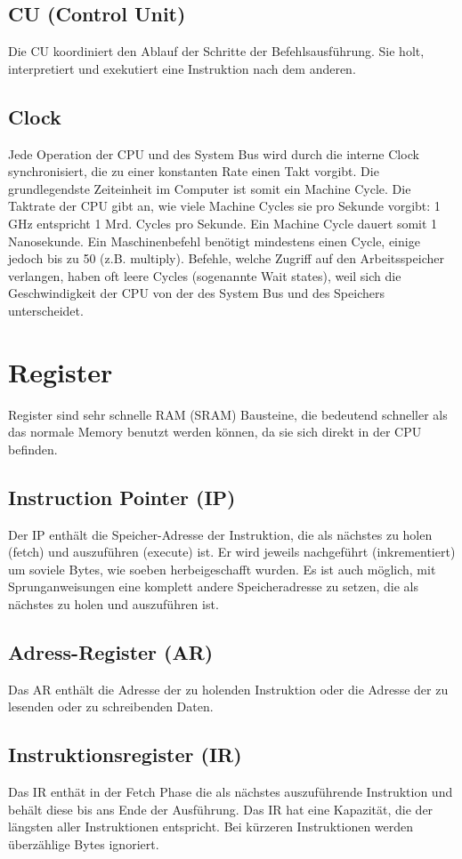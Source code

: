\documentclass[a4paper,10pt]{report}
\begin{document}
\subsection{CU (Control Unit)}
Die CU koordiniert den Ablauf der Schritte der Befehlsausführung. Sie holt, interpretiert und exekutiert eine Instruktion nach dem anderen. 
\subsection{Clock}
Jede Operation der CPU und des System Bus wird durch die interne Clock synchronisiert, die zu einer konstanten Rate einen Takt vorgibt. Die grundlegendste Zeiteinheit im Computer ist somit ein Machine Cycle.
Die Taktrate der CPU gibt an, wie viele Machine Cycles sie pro Sekunde vorgibt: 1 GHz entspricht 1 Mrd. Cycles pro Sekunde. Ein Machine Cycle dauert somit 1 Nanosekunde. Ein Maschinenbefehl benötigt mindestens einen Cycle, einige jedoch bis zu 50 (z.B. multiply). Befehle, welche Zugriff auf den Arbeitsspeicher verlangen, haben oft leere Cycles (sogenannte Wait states), weil sich die Geschwindigkeit der CPU von der des System Bus und des Speichers unterscheidet.
\section{Register}
Register sind sehr schnelle RAM (SRAM) Bausteine, die bedeutend schneller als das normale Memory benutzt werden können, da sie sich direkt in der CPU befinden.
\subsection{Instruction Pointer (IP)}
Der IP enthält die Speicher-Adresse der Instruktion, die als nächstes zu holen (fetch) und auszuführen (execute) ist. Er wird jeweils nachgeführt (inkrementiert) um soviele Bytes, wie soeben herbeigeschafft wurden. Es ist auch möglich, mit Sprunganweisungen eine komplett andere Speicheradresse zu setzen, die als nächstes zu holen und auszuführen ist.
\subsection{Adress-Register (AR)}
Das AR enthält die Adresse der zu holenden Instruktion oder die Adresse der zu lesenden oder zu schreibenden Daten.
\subsection{Instruktionsregister (IR)}
Das IR enthät in der Fetch Phase die als nächstes auszuführende Instruktion und behält diese bis ans Ende der Ausführung. Das IR hat eine Kapazität, die der längsten aller Instruktionen entspricht. Bei kürzeren Instruktionen werden überzählige Bytes ignoriert.
\end{document}
